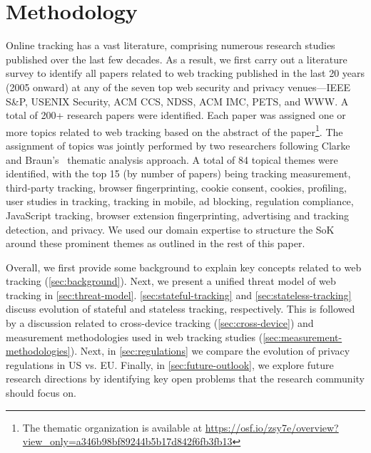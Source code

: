 \section{Methodology}
\label{sec:methodology}

Online tracking has a vast literature, comprising numerous research studies published over the last few decades.
%
As a result, we first carry out a literature survey to identify all papers related to web tracking published in the last 20 years (2005 onward) at any of the seven top web security and privacy venues---IEEE S\&P, USENIX Security, ACM CCS, NDSS, ACM IMC, PETS, and WWW.
%
A total of 200+ research papers were identified. 
%
Each paper was assigned one or more topics related to web tracking based on the abstract of the paper\footnote{The thematic organization is available at \url{https://osf.io/zsy7e/overview?view_only=a346b98bf89244b5b17d842f6fb3fb13}}.
%
The assignment of topics was jointly performed by two researchers following Clarke and Braun’s~\cite{clarke2013successful} thematic analysis approach.
%
A total of 84 topical themes were identified, with the top 15 (by number of papers) being tracking measurement, third-party tracking, browser fingerprinting, cookie consent, cookies, profiling, user studies in tracking, tracking in mobile, ad blocking, regulation compliance, JavaScript tracking, browser extension fingerprinting, advertising and tracking detection, and privacy.
%
We used our domain expertise to structure the SoK around these prominent themes as outlined in the rest of this paper. 


Overall, we first provide some background to explain key concepts related to web tracking (\autoref{sec:background}). 
%
Next, we present a unified threat model of web tracking in \autoref{sec:threat-model}. \autoref{sec:stateful-tracking} and \autoref{sec:stateless-tracking} discuss evolution of stateful and stateless tracking, respectively. 
%
This is followed by a discussion related to cross-device tracking (\autoref{sec:cross-device}) and measurement methodologies used in web tracking studies (\autoref{sec:measurement-methodologies}). 
%
Next, in \autoref{sec:regulations} we compare the evolution of privacy regulations in US vs. EU. 
%
Finally, in \autoref{sec:future-outlook}, we explore future research directions by identifying key open problems that the research community should focus on.
